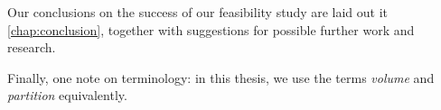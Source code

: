 Our conclusions on the success of our feasibility study are laid out it \autoref{chap:conclusion}, together with suggestions for possible further work and research.

Finally, one note on terminology: in this thesis, we use the terms \emph{volume} and \emph{partition} equivalently.
%
